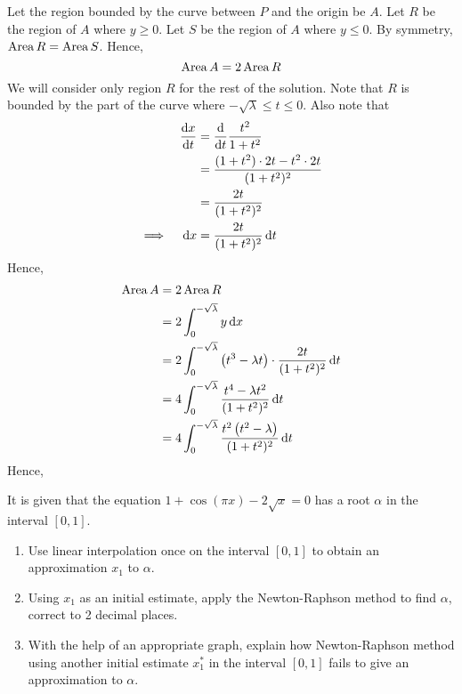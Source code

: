 \documentclass{echw}
\begin{document}
            \noindent Let the region bounded by the curve between $P$ and the origin be $A$. Let $R$ be the region of $A$ where $y \geq 0$. Let $S$ be the region of $A$ where $y \leq 0$. By symmetry, $\operatorname{Area} R = \operatorname{Area} S$. Hence,
            \begin{equation*}
                \operatorname{Area} A = 2\operatorname{Area} R
            \end{equation*}
            We will consider only region $R$ for the rest of the solution. Note that $R$ is bounded by the part of the curve where $-\sqrt \lambda \leq t \leq 0$. Also note that
            \begin{alignat*}{2}
                &&\dfrac{\mathrm{d} x}{\mathrm{d} t} &= \dfrac{\mathrm{d} }{\mathrm{d} t} \dfrac{t^2}{1 + t^2}\\
                && &= \dfrac{(1+t^2) \cdot 2t - t^2 \cdot 2t}{(1+t^2)^2}\\
                && &= \dfrac{2t}{(1+t^2)^2}\\
                \implies&&\mathop{\mathrm{d}x} &= \dfrac{2t}{(1+t^2)^2} \mathop{\mathrm{d}t}
            \end{alignat*}
            Hence,
            \begin{align*}
                \operatorname{Area} A &= 2 \operatorname{Area} R\\
                &= 2 \int_0^{-\sqrt{\lambda}} y \mathop{\mathrm{d}x}\\
                &= 2 \int_0^{-\sqrt{\lambda}} \left(t^3 - \lambda t\right) \cdot \dfrac{2t}{(1+t^2)^2} \mathop{\mathrm{d}t}\\
                &= 4 \int_0^{-\sqrt{\lambda}}\dfrac{t^4 - \lambda t^2}{(1+t^2)^2} \mathop{\mathrm{d}t}\\
                &= 4 \int_0^{-\sqrt{\lambda}}\dfrac{t^2 \left(t^2 - \lambda\right)}{(1+t^2)^2} \mathop{\mathrm{d}t}
            \end{align*}
            Hence,

    \problem{}
        It is given that the equation $1 + \cos(\pi x) - 2\sqrt{x} = 0$ has a root $\alpha$ in the interval $[0, 1]$.

        \begin{enumerate}
            \item Use linear interpolation once on the interval $[0, 1]$ to obtain an approximation $x_1$ to $\alpha$.
            \item Using $x_1$ as an initial estimate, apply the Newton-Raphson method to find $\alpha$, correct to 2 decimal places.
            \item With the help of an appropriate graph, explain how Newton-Raphson method using another initial estimate $x_1^\ast$ in the interval $[0, 1]$ fails to give an approximation to $\alpha$.
        \end{enumerate}
    
\end{document}
